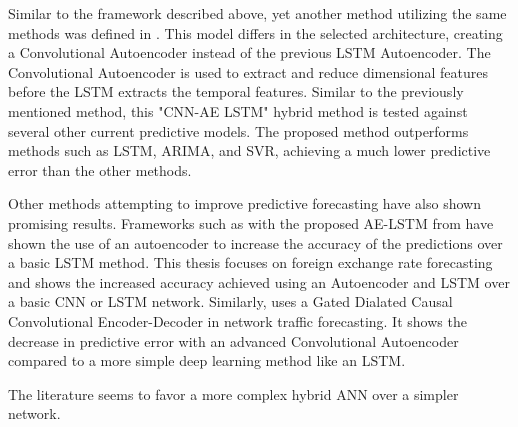 Similar to the framework described above, yet another method utilizing the same methods was defined in \cite{Zhao2019}.
This model differs in the selected architecture, creating a Convolutional Autoencoder instead of the previous LSTM Autoencoder.
The Convolutional Autoencoder is used to extract and reduce dimensional features before the LSTM extracts the temporal features.
Similar to the previously mentioned method, this "CNN-AE LSTM" hybrid method is tested against several other current predictive models.
The proposed method outperforms methods such as LSTM, ARIMA, and SVR, achieving a much lower predictive error than the other methods.


Other methods attempting to improve predictive forecasting have also shown promising results.
Frameworks such as with the proposed AE-LSTM from \cite{VanHoa2021} have shown the use of an autoencoder to increase the accuracy of the predictions over a basic LSTM method.
This thesis focuses on foreign exchange rate forecasting and shows the increased accuracy achieved using an Autoencoder and LSTM over a basic CNN or LSTM network.
Similarly, \cite{Zhang2020} uses a Gated Dialated Causal Convolutional Encoder-Decoder in network traffic forecasting.
It shows the decrease in predictive error with an advanced Convolutional Autoencoder compared to a more simple deep learning method like an LSTM.

The literature seems to favor a more complex hybrid ANN over a simpler network.




\iffalse
  The proposed problem-space has data with high fluctuations and noise.
  In order to increase the predictive abilities of a model, a method well suited for working with data with high noise should be selected.
  A CNN-AE model should be able to solve this problem.
  The CNN is able to extract the spatial features of the data while the AE can filter out the noise and fluctuations in the data.
  By then adding a LSTM network at the end, the model should be able to extract the temoral featrues from the data.
  This hybrid framework should therefore be well suited for the task at hand.
\fi
